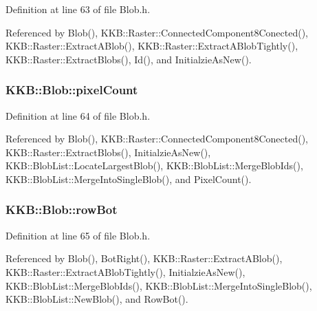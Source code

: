 Definition at line 63 of file Blob.\+h.



Referenced by Blob(), K\+K\+B\+::\+Raster\+::\+Connected\+Component8\+Conected(), K\+K\+B\+::\+Raster\+::\+Extract\+A\+Blob(), K\+K\+B\+::\+Raster\+::\+Extract\+A\+Blob\+Tightly(), K\+K\+B\+::\+Raster\+::\+Extract\+Blobs(), Id(), and Initialzie\+As\+New().

\subsubsection[{\texorpdfstring{pixel\+Count}{pixelCount}}]{ K\+K\+B\+::\+Blob\+::pixel\+Count}\hypertarget{class_k_k_b_1_1_blob_a415767d4a364df537d7b2fc06a95721d}{}\label{class_k_k_b_1_1_blob_a415767d4a364df537d7b2fc06a95721d}


Definition at line 64 of file Blob.\+h.



Referenced by Blob(), K\+K\+B\+::\+Raster\+::\+Connected\+Component8\+Conected(), K\+K\+B\+::\+Raster\+::\+Extract\+Blobs(), Initialzie\+As\+New(), K\+K\+B\+::\+Blob\+List\+::\+Locate\+Largest\+Blob(), K\+K\+B\+::\+Blob\+List\+::\+Merge\+Blob\+Ids(), K\+K\+B\+::\+Blob\+List\+::\+Merge\+Into\+Single\+Blob(), and Pixel\+Count().

\subsubsection[{\texorpdfstring{row\+Bot}{rowBot}}]{ K\+K\+B\+::\+Blob\+::row\+Bot}\hypertarget{class_k_k_b_1_1_blob_ae6f6816134ac19c54071eca96dd89910}{}\label{class_k_k_b_1_1_blob_ae6f6816134ac19c54071eca96dd89910}


Definition at line 65 of file Blob.\+h.



Referenced by Blob(), Bot\+Right(), K\+K\+B\+::\+Raster\+::\+Extract\+A\+Blob(), K\+K\+B\+::\+Raster\+::\+Extract\+A\+Blob\+Tightly(), Initialzie\+As\+New(), K\+K\+B\+::\+Blob\+List\+::\+Merge\+Blob\+Ids(), K\+K\+B\+::\+Blob\+List\+::\+Merge\+Into\+Single\+Blob(), K\+K\+B\+::\+Blob\+List\+::\+New\+Blob(), and Row\+Bot().

